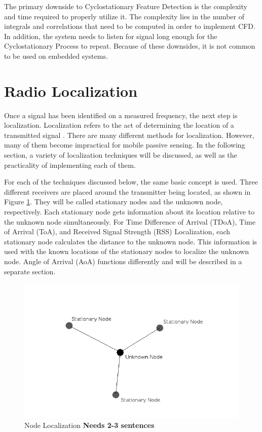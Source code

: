 The primary downside to Cyclostationary Feature Detection is the complexity and time required to properly utilize it. The complexity lies in the number of integrals and correlations that need to be computed in order to implement CFD. In addition, the system needs to listen for signal long enough for the Cyclostationary Process to repeat. Because of these downsides, it is not common to be used on embedded systems. \par


\section{Radio Localization}
Once a signal has been identified on a measured frequency, the next step is localization. Localization refers to the act of determining the location of a transmitted signal \cite{local_conf}. There are many different methods for localization. However, many of them become impractical for mobile passive sensing. In the following section, a variety of localization techniques will be discussed, as well as the practicality of implementing each of them.\par
For each of the techniques discussed below, the same basic concept is used. Three different receivers are placed around the transmitter being located, as shown in Figure \ref{fig:node_localization}.  They will be called stationary nodes and the unknown node, respectively. Each stationary node gets information about its location relative to the unknown node simultaneously. For Time Difference of Arrival (TDoA), Time of Arrival (ToA), and Received Signal Strength (RSS) Localization, each stationary node calculates the distance to the unknown node. This information is used with the known locations of the stationary nodes to localize the unknown node. Angle of Arrival (AoA) functions differently and will be described in a separate section. \par

\begin{figure}[ht]
\centering
\includegraphics[scale=0.5]{img/node-localization-lines.png}
\caption{Node Localization \textbf{Needs 2-3 sentences}}
\label{fig:node_localization}
\end{figure}\par

